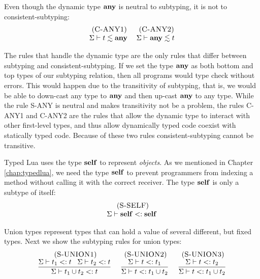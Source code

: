 Even though the dynamic type $\mathbf{any}$ is neutral to subtyping,
it is not to consistent-subtyping:
\[
\begin{array}{c}
\begin{array}{c}
\; (\textsc{C-ANY1})\\
\Sigma \vdash t \lesssim \mathbf{any}
\end{array}
\;
\begin{array}{c}
\; (\textsc{C-ANY2})\\
\Sigma \vdash \mathbf{any} \lesssim t
\end{array}
\end{array}
\]

The rules that handle the dynamic type are the only rules that
differ between subtyping and consistent-subtyping.
If we set the type $\mathbf{any}$ as both bottom and top types of our
subtyping relation, then all programs would type check without errors.
This would happen due to the transitivity of subtyping, that is,
we would be able to down-cast any type to $\mathbf{any}$ and then up-cast
$\mathbf{any}$ to any type.
While the rule \textsc{S-ANY} is neutral and makes transitivity
not be a problem, the rules \textsc{C-ANY1} and \textsc{C-ANY2}
are the rules that allow the dynamic type to interact with other
first-level types, and thus allow dynamically typed code coexist
with statically typed code.
Because of these two rules consistent-subtyping cannot be transitive.

Typed Lua uses the type $\mathbf{self}$ to represent \emph{objects}.
As we mentioned in Chapter \ref{chap:typedlua}, we need the type
$\mathbf{self}$ to prevent programmers from indexing a method without
calling it with the correct receiver.
The type $\mathbf{self}$ is only a subtype of itself:
\[
\begin{array}{c}
\; (\textsc{S-SELF})\\
\Sigma \vdash \mathbf{self} <: \mathbf{self}
\end{array}
\]

Union types represent types that can hold a value of several
different, but fixed types.
Next we show the subtyping rules for union types:
\[
\begin{array}{c}
\begin{array}{c}
\; (\textsc{S-UNION1})\\
\dfrac{\Sigma \vdash t_{1} <: t \;\;\;
       \Sigma \vdash t_{2} <: t}
      {\Sigma \vdash t_{1} \cup t_{2} <: t}
\end{array}
\;
\begin{array}{c}
\; (\textsc{S-UNION2})\\
\dfrac{\Sigma \vdash t <: t_{1}}
      {\Sigma \vdash t <: t_{1} \cup t_{2}}
\end{array}
\;
\begin{array}{c}
\; (\textsc{S-UNION3})\\
\dfrac{\Sigma \vdash t <: t_{2}}
      {\Sigma \vdash t <: t_{1} \cup t_{2}}
\end{array}
\end{array}
\]

